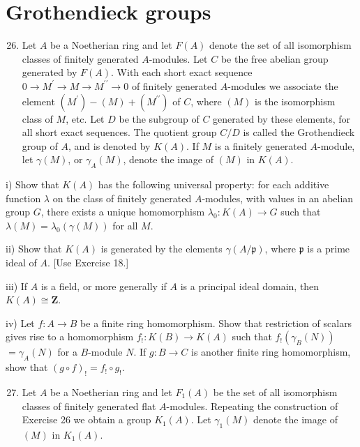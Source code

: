 \documentclass{standalone}
\theoremstyle{definition}
\theoremstyle{remark}
\begin{document}
\section{Grothendieck groups}
\begin{enumerate}
  \setcounter{enumi}{25}
  \item Let $A$ be a Noetherian ring and let $F(A)$ denote the set of all isomorphism classes of finitely generated $A$-modules. Let $C$ be the free abelian group generated by $F(A)$. With each short exact sequence $0 \rightarrow M^{\prime} \rightarrow M \rightarrow M^{\prime \prime} \rightarrow 0$ of finitely generated $A$-modules we associate the element $\left(M^{\prime}\right)-(M)+\left(M^{\prime \prime}\right)$ of $C$, where $(M)$ is the isomorphism class of $M$, etc. Let $D$ be the subgroup of $C$ generated by these elements, for all short exact sequences. The quotient group $C / D$ is called the Grothendieck group of $A$, and is denoted by $K(A)$. If $M$ is a finitely generated $A$-module, let $\gamma(M)$, or $\gamma_{A}(M)$, denote the image of $(M)$ in $K(A)$.
\end{enumerate}

i) Show that $K(A)$ has the following universal property: for each additive function $\lambda$ on the class of finitely generated $A$-modules, with values in an abelian group $G$, there exists a unique homomorphism $\lambda_{0}: K(A) \rightarrow G$ such that $\lambda(M)=\lambda_{0}(\gamma(M))$ for all $M$.

ii) Show that $K(A)$ is generated by the elements $\gamma(A / \mathfrak{p})$, where $\mathfrak{p}$ is a prime ideal of $A$. [Use Exercise 18.]

iii) If $A$ is a field, or more generally if $A$ is a principal ideal domain, then $K(A) \cong \mathbf{Z}$.

iv) Let $f: A \rightarrow B$ be a finite ring homomorphism. Show that restriction of scalars gives rise to a homomorphism $f_{!}: K(B) \rightarrow K(A)$ such that $f_{!}\left(\gamma_{B}(N)\right)$ $=\gamma_{A}(N)$ for a $B$-module $N$. If $g: B \rightarrow C$ is another finite ring homomorphism, show that $(g \circ f)_{!}=f_{!} \circ g_{!}$.

\begin{enumerate}
  \setcounter{enumi}{26}
  \item Let $A$ be a Noetherian ring and let $F_{1}(A)$ be the set of all isomorphism classes of finitely generated flat $A$-modules. Repeating the construction of Exercise 26 we obtain a group $K_{1}(A)$. Let $\gamma_{1}(M)$ denote the image of $(M)$ in $K_{1}(A)$.
\end{enumerate}
\end{document}
